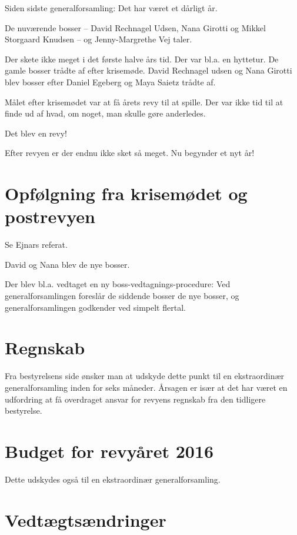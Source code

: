 \documentclass[a4paper,11pt]{report}
\begin{document}
Siden sidste generalforsamling: Det har været et dårligt år.

De nuværende bosser -- David Rechnagel Udsen, Nana Girotti og Mikkel Storgaard
Knudsen -- og Jenny-Margrethe Vej taler.

Der skete ikke meget i det første halve års tid.  Der var bl.a. en hyttetur.  De
gamle bosser trådte af efter krisemøde.  David Rechnagel udsen og Nana Girotti
blev bosser efter Daniel Egeberg og Maya Saietz trådte af.

Målet efter krisemødet var at få årets revy til at spille.  Der var ikke tid til
at finde ud af hvad, om noget, man skulle gøre anderledes.

Det blev en revy!

Efter revyen er der endnu ikke sket så meget.  Nu begynder et nyt år!

\section*{Opfølgning fra krisemødet og postrevyen}

Se Ejnars referat.

David og Nana blev de nye bosser.

Der blev bl.a. vedtaget en ny boss-vedtagnings-procedure: Ved generalforsamlingen
foreslår de siddende bosser de nye bosser, og generalforsamlingen godkender ved
simpelt flertal.

\section*{Regnskab}

Fra bestyrelsens side ønsker man at udskyde dette punkt til en ekstraordinær
generalforsamling inden for seks måneder.  Årsagen er især at det har været en
udfordring at få overdraget ansvar for revyens regnskab fra den tidligere
bestyrelse.

\section*{Budget for revyåret 2016}

Dette udskydes også til en ekstraordinær generalforsamling.

\newpage

\section*{Vedtægtsændringer}
\end{document}
